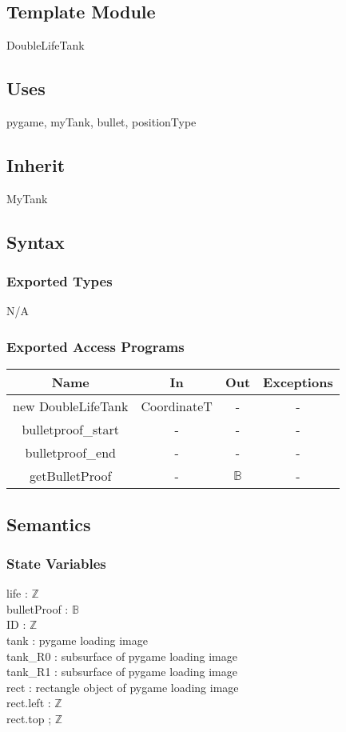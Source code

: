 \documentclass[12pt, titlepage]{article}
\begin{document}
        \subsection{Template Module}
        DoubleLifeTank
        \subsection{Uses}
        pygame, myTank, bullet, positionType
        \subsection{Inherit}
        MyTank
        
		\subsection{Syntax}
		\subsubsection{Exported Types}
		N/A
		\subsubsection{Exported Access Programs}
		\begin{tabular}[pos]{|c|c|c|c|}
			
			\hline
			\textbf{Name}& \textbf{In} & \textbf{Out} & \textbf{Exceptions} \\ \hline
			new DoubleLifeTank & CoordinateT & - & -\\ \hline
			bulletproof\_start & - & - & -\\ \hline
			bulletproof\_end & - & - & -\\ \hline
			getBulletProof & - & $\mathbb{B}$ & -\\ \hline
			
		\end{tabular}
		
		\subsection{Semantics}
		\subsubsection{State Variables}
		life : $\mathbb{Z}$\\
		bulletProof : $\mathbb{B}$\\
		ID : $\mathbb{Z}$\\
		tank : pygame loading image\\
		tank\_R0 : subsurface of pygame loading image\\
		tank\_R1 : subsurface of pygame loading image\\
		rect : rectangle object of pygame loading image\\
		rect.left : $\mathbb{Z}$\\
		rect.top ; $\mathbb{Z}$
		
\end{document}

